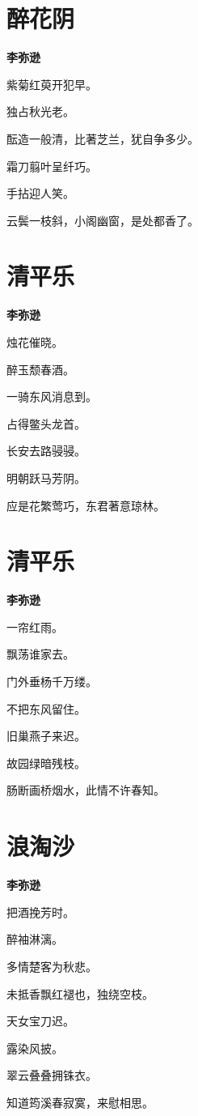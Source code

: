 \documentclass[12pt,a4paper]{ctexbook}
\begin{document}
\section{醉花阴}
\textbf{李弥逊}\par\vspace{0.5em}
紫菊红萸开犯早。\par
独占秋光老。\par
酝造一般清，比著芝兰，犹自争多少。\par
霜刀翦叶呈纤巧。\par
手拈迎人笑。\par
云鬓一枝斜，小阁幽窗，是处都香了。\par

\section{清平乐}
\textbf{李弥逊}\par\vspace{0.5em}
烛花催晓。\par
醉玉颓春酒。\par
一骑东风消息到。\par
占得鳖头龙首。\par
长安去路骎骎。\par
明朝跃马芳阴。\par
应是花繁莺巧，东君著意琼林。\par

\section{清平乐}
\textbf{李弥逊}\par\vspace{0.5em}
一帘红雨。\par
飘荡谁家去。\par
门外垂杨千万缕。\par
不把东风留住。\par
旧巢燕子来迟。\par
故园绿暗残枝。\par
肠断画桥烟水，此情不许春知。\par

\section{浪淘沙}
\textbf{李弥逊}\par\vspace{0.5em}
把酒挽芳时。\par
醉袖淋漓。\par
多情楚客为秋悲。\par
未抵香飘红褪也，独绕空枝。\par
天女宝刀迟。\par
露染风披。\par
翠云叠叠拥铢衣。\par
知道筠溪春寂寞，来慰相思。\par
\end{document}

